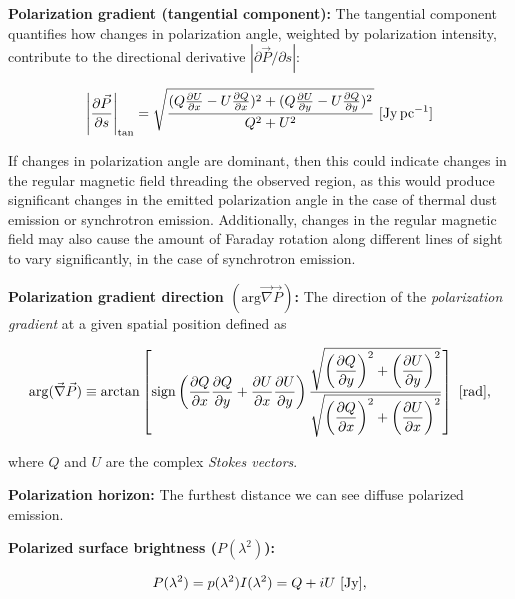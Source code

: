 \documentclass[a4paper,10pt]{article}
\begin{document}
{\noindent}\textbf{Polarization gradient (tangential component):} The tangential component quantifies how changes in polarization angle, weighted by polarization intensity, contribute to the directional derivative $|\partial\vec{P}/\partial s|$:

\begin{align*}
    \left\lvert\frac{\partial\vec{P}}{\partial s}\right\rvert_\mathrm{tan} = \sqrt{\frac{(Q\frac{\partial U}{\partial x} - U\frac{\partial Q}{\partial x})^2 + (Q\frac{\partial U}{\partial y} - U\frac{\partial Q}{\partial y})^2}{Q^2+U^2}} ~ [{\rm Jy\,pc^{-1}}]
\end{align*}

{\noindent}If changes in polarization angle are dominant, then this could indicate changes in the regular magnetic field threading the observed region, as this would produce significant changes in the emitted polarization angle in the case of thermal dust emission or synchrotron emission. Additionally, changes in the regular magnetic field may also cause the amount of Faraday rotation along different lines of sight to vary significantly, in the case of synchrotron emission.

{\noindent}\textbf{Polarization gradient direction $(\mathrm{arg}\vec\nabla\vec{P})$:} The direction of the \textit{polarization gradient} at a given spatial position defined as

\begin{align*}
    \mathrm{arg}(\vec\nabla\vec{P}) \equiv \arctan \left[ \mathrm{sign} \left(\dfrac{\partial Q}{\partial x}\dfrac{\partial Q}{\partial y} + \dfrac{\partial U}{\partial x}\dfrac{\partial U}{\partial y}\right) \dfrac{\sqrt{\left(\dfrac{\partial Q}{\partial y}\right)^2 + \left(\dfrac{\partial U}{\partial y}\right)^2}}{\sqrt{\left(\dfrac{\partial Q}{\partial x}\right)^2 + \left(\dfrac{\partial U}{\partial x}\right)^2}} \right] ~ [{\rm rad}],
\end{align*}

{\noindent}where $Q$ and $U$ are the complex \textit{Stokes vectors}.

{\noindent}\textbf{Polarization horizon:} The furthest distance we can see diffuse polarized emission.

{\noindent}\textbf{Polarized surface brightness ($P(\lambda^2)$):} 

\begin{align*}
    P(\lambda^2) = p(\lambda^2)I(\lambda^2) = Q + iU ~ [{\rm Jy}],
\end{align*}
\end{document}
